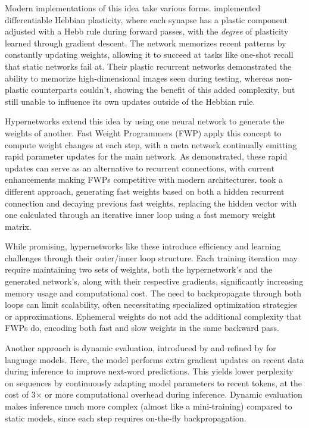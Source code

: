 \documentclass[conference]{IEEEtran}
\begin{document}
Modern implementations of this idea take various forms. \cite{miconiDifferentiablePlasticityTraining2018a} implemented differentiable Hebbian plasticity, where each synapse has a plastic component adjusted with a Hebb rule during forward passes, with the \emph{degree} of plasticity learned through gradient descent. The network memorizes recent patterns by constantly updating weights, allowing it to succeed at tasks like one-shot recall that static networks fail at. Their plastic recurrent networks demonstrated the ability to memorize high-dimensional images seen during testing, whereas non-plastic counterparts couldn't, showing the benefit of this added complexity, but still unable to influence its own updates outside of the Hebbian rule.

Hypernetworks extend this idea by using one neural network to generate the weights of another. Fast Weight Programmers (FWP) apply this concept to compute weight changes at each step, with a meta network continually emitting rapid parameter updates for the main network. As  \cite{irieGoingLinearTransformers2021a} demonstrated, these rapid updates can serve as an alternative to recurrent connections, with current enhancements making FWPs competitive with modern architectures. \cite{baUsingFastWeights2016} took a different approach, generating fast weights based on both a hidden recurrent connection and decaying previous fast weights, replacing the hidden vector with one calculated through an iterative inner loop using a fast memory weight matrix.

While promising, hypernetworks like these introduce efficiency and learning challenges through their outer/inner loop structure. Each training iteration may require maintaining two sets of weights, both the hypernetwork's and the generated network's, along with their respective gradients, significantly increasing memory usage and computational cost. The need to backpropagate through both loops can limit scalability, often necessitating specialized optimization strategies or approximations. Ephemeral weights do not add the additional complexity that FWPs do, encoding both fast and slow weights in the same backward pass.

Another approach is dynamic evaluation, introduced by \cite{mikolovRecurrentNeuralNetwork2010} and refined by \cite{pmlr-v80-krause18a} for language models. Here, the model performs extra gradient updates on recent data during inference to improve next-word predictions. This yields lower perplexity on sequences by continuously adapting model parameters to recent tokens, at the cost of 3× or more computational overhead during inference. Dynamic evaluation makes inference much more complex (almost like a mini-training) compared to static models, since each step requires on-the-fly backpropagation.
\end{document}
